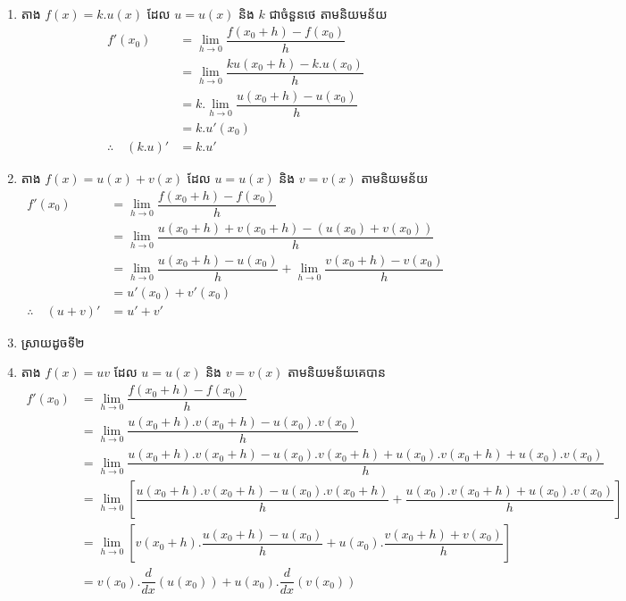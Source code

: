 \documentclass[a4paper,12pt]{article}
\begin{document}
\begin{enumerate}
	\item តាង $f(x)=k.u(x)$  ដែល $u=u(x)$ និង $k$ ជាចំនួនថេ តាមនិយមន័យ
	      \begin{align*}
		      f'(x_0)                 & =\lim_{h\to 0}\dfrac{f(x_0+h)-f(x_0)}{h}     \\
		                              & =\lim_{h\to 0}\dfrac{ku(x_0+h)-k.u(x_0) }{h} \\
		                              & =k.\lim_{h\to 0}\dfrac{u(x_0+h)-u(x_0)}{h}   \\
		                              & =k.u'(x_0)                                   \\
		      \therefore \quad (k.u)' & =k.u'
	      \end{align*}
	\item តាង $f(x)=u(x)+ v(x)$  ដែល $u=u(x)$ និង $v=v(x)$ តាមនិយមន័យ
	      \begin{align*}
		      f'(x_0)                 & =\lim_{h\to 0}\dfrac{f(x_0+h)-f(x_0)}{h}                                         \\
		                              & =\lim_{h\to 0}\dfrac{u(x_0+h)+ v(x_0+h)-(u(x_0)+ v(x_0)) }{h}                    \\
		                              & =\lim_{h\to 0}\dfrac{u(x_0+h)-u(x_0)}{h}+\lim_{h\to 0}\dfrac{v(x_0+h)-v(x_0)}{h} \\
		                              & =u'(x_0)+v'(x_0)                                                                 \\
		      \therefore \quad (u+v)' & =u'+v'
	      \end{align*}
	\item ស្រាយដូចទី២
	\item តាង $f(x)=uv$ ដែល $u=u(x)$ និង $v=v(x)$ តាមនិយមន័យគេបាន
	      \begin{align*}
		      f'(x_0) & =\lim_{h\to 0}\dfrac{f(x_0+h)-f(x_0)}{h}                                                                         \\
		              & =\lim_{h\to 0}\dfrac{u(x_0+h).v(x_0+h)-u(x_0).v(x_0)}{h}                                                         \\
		              & =\lim_{h\to 0}\dfrac{u(x_0+h).v(x_0+h)-u(x_0).v(x_0+h)+u(x_0).v(x_0+h)+u(x_0).v(x_0)}{h}                         \\
		              & =\lim_{h\to 0}\left[\dfrac{u(x_0+h).v(x_0+h)-u(x_0).v(x_0+h)}{h}+\dfrac{u(x_0).v(x_0+h)+u(x_0).v(x_0)}{h}\right] \\
		              & =\lim_{h\to 0}\left[v(x_0+h).\dfrac{u(x_0+h)-u(x_0)}{h}+u(x_0).\dfrac{v(x_0+h)+v(x_0)}{h}\right]                 \\
		              & =v(x_0).\dfrac{d}{dx}(u(x_0))+u(x_0).\dfrac{d}{dx}(v(x_0))                                                       \\
	      \end{align*}


\end{enumerate}
\end{document}
